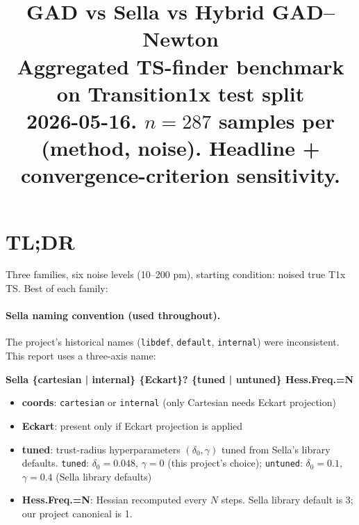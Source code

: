 \documentclass[11pt]{article}
\title{\Large\textbf{GAD vs Sella vs Hybrid GAD--Newton}\\[4pt]
\large Aggregated TS-finder benchmark on Transition1x test split\\[2pt]
\normalsize 2026-05-16. $n=287$ samples per (method, noise). Headline + convergence-criterion sensitivity.}
\author{}
\date{}
\begin{document}
\maketitle
\thispagestyle{empty}

\section*{TL;DR}

Three families, six noise levels (10--200 pm), starting condition: noised
true T1x TS. Best of each family:

\begin{center}\small{}
\end{center}

\paragraph{Sella naming convention (used throughout).}
The project's historical names (\texttt{libdef}, \texttt{default}, \texttt{internal})
were inconsistent. This report uses a three-axis name:

\begin{center}\footnotesize
\textbf{Sella \{cartesian | internal\} \{Eckart\}? \{tuned | untuned\} Hess.Freq.=N}
\end{center}

\begin{itemize}[leftmargin=1.5em, itemsep=0.05em]
\item \textbf{coords}: \texttt{cartesian} or \texttt{internal} (only Cartesian needs Eckart projection)
\item \textbf{Eckart}: present only if Eckart projection is applied
\item \textbf{tuned}: trust-radius hyperparameters $(\delta_0,\gamma)$ tuned from Sella's library defaults.
  \texttt{tuned}: $\delta_0{=}0.048$, $\gamma{=}0$ (this project's choice); \texttt{untuned}: $\delta_0{=}0.1$, $\gamma{=}0.4$ (Sella library defaults)
\item \textbf{Hess.Freq.=N}: Hessian recomputed every $N$ steps. Sella library default is 3; our project canonical is 1.
\end{itemize}
\end{document}
